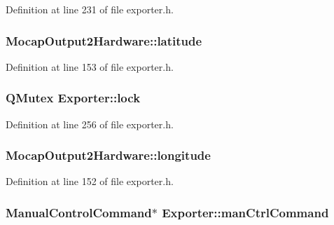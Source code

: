 Definition at line 231 of file exporter.\-h.

\hypertarget{group___mo_cap_plugin_gacfbf5cf513abfc200b4fd5c14dad294c}{
\subsubsection[{latitude}]{ Mocap\-Output2\-Hardware\-::latitude}}\label{group___mo_cap_plugin_gacfbf5cf513abfc200b4fd5c14dad294c}


Definition at line 153 of file exporter.\-h.

\hypertarget{group___mo_cap_plugin_ga55a5f9c6eb2d80cfc96523f4592f5417}{
\subsubsection[{lock}]{\setlength{\rightskip}{0pt plus 5cm}Q\-Mutex Exporter\-::lock\hspace{0.3cm}{\ttfamily [protected]}}}\label{group___mo_cap_plugin_ga55a5f9c6eb2d80cfc96523f4592f5417}


Definition at line 256 of file exporter.\-h.

\hypertarget{group___mo_cap_plugin_ga65a9de4b87de2a4aaff0760f2b912407}{
\subsubsection[{longitude}]{ Mocap\-Output2\-Hardware\-::longitude}}\label{group___mo_cap_plugin_ga65a9de4b87de2a4aaff0760f2b912407}


Definition at line 152 of file exporter.\-h.

\hypertarget{group___mo_cap_plugin_ga8855725831e82f6e02e0caba72c0dd7b}{
\subsubsection[{man\-Ctrl\-Command}]{\setlength{\rightskip}{0pt plus 5cm}Manual\-Control\-Command$\ast$ Exporter\-::man\-Ctrl\-Command\hspace{0.3cm}{\ttfamily [protected]}}}\label{group___mo_cap_plugin_ga8855725831e82f6e02e0caba72c0dd7b}


